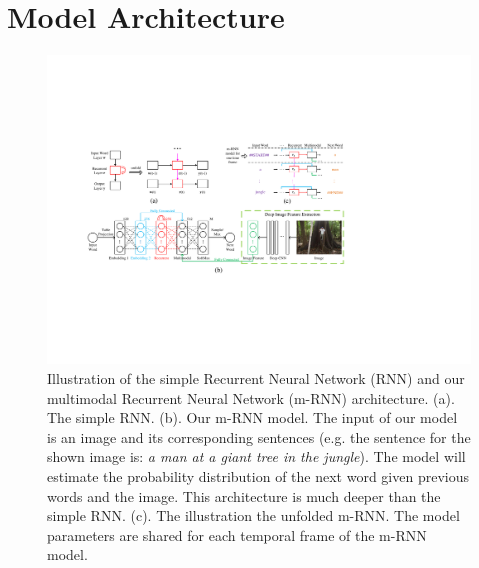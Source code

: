 
\section{Model Architecture}

\begin{figure}[htb]
\begin{center}
\includegraphics[width=0.95\linewidth]{PaperFigures/arch_final_visio.pdf}
\end{center}
   \caption{Illustration of the simple Recurrent Neural Network (RNN) and our multimodal Recurrent Neural Network (m-RNN) architecture.
   (a). The simple RNN. 
   (b). Our m-RNN model.
   The input of our model is an image and its corresponding sentences (e.g. the sentence for the shown image is: \emph{a man at a giant tree in the jungle}).
   The model will estimate the probability distribution of the next word given previous words and the image.
   This architecture is much deeper than the simple RNN.
   (c). The illustration the unfolded m-RNN. 
   The model parameters are shared for each temporal frame of the m-RNN model.
   }
\label{fig:illu_RNN}
\end{figure}

